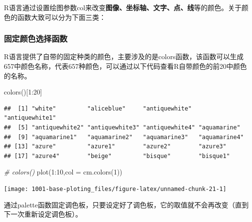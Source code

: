 \documentclass[
]{book}
\newenvironment{Shaded}{\begin{snugshade}}{\end{snugshade}}
\newcommand{\AttributeTok}[1]{\textcolor[rgb]{0.77,0.63,0.00}{#1}}
\newcommand{\CommentTok}[1]{\textcolor[rgb]{0.56,0.35,0.01}{\textit{#1}}}
\newcommand{\DecValTok}[1]{\textcolor[rgb]{0.00,0.00,0.81}{#1}}
\newcommand{\FunctionTok}[1]{\textcolor[rgb]{0.00,0.00,0.00}{#1}}
\newcommand{\NormalTok}[1]{#1}
\newcommand{\SpecialCharTok}[1]{\textcolor[rgb]{0.00,0.00,0.00}{#1}}
\begin{document}
R语言通过设置绘图参数col来改变\textbf{图像、坐标轴、文字、点、线}等的颜色。关于颜色的函数大致可以分为下面三类：

\hypertarget{ux56faux5b9aux989cux8272ux9009ux62e9ux51fdux6570}{%
\subsubsection{固定颜色选择函数}\label{ux56faux5b9aux989cux8272ux9009ux62e9ux51fdux6570}}

R语言提供了自带的固定种类的颜色，主要涉及的是colors函数，该函数可以生成657中颜色名称，代表657种颜色，可以通过以下代码查看R自带颜色的前20中颜色的名称。

\begin{Shaded}
\begin{Highlighting}[]
\FunctionTok{colors}\NormalTok{()[}\DecValTok{1}\SpecialCharTok{:}\DecValTok{20}\NormalTok{] }
\end{Highlighting}
\end{Shaded}

\begin{verbatim}
##  [1] "white"         "aliceblue"     "antiquewhite"  "antiquewhite1"
##  [5] "antiquewhite2" "antiquewhite3" "antiquewhite4" "aquamarine"   
##  [9] "aquamarine1"   "aquamarine2"   "aquamarine3"   "aquamarine4"  
## [13] "azure"         "azure1"        "azure2"        "azure3"       
## [17] "azure4"        "beige"         "bisque"        "bisque1"
\end{verbatim}

\begin{Shaded}
\begin{Highlighting}[]
\CommentTok{\# colors()}
\FunctionTok{plot}\NormalTok{(}\DecValTok{1}\SpecialCharTok{:}\DecValTok{10}\NormalTok{,}\AttributeTok{col =} \FunctionTok{cm.colors}\NormalTok{(}\DecValTok{1}\NormalTok{))}
\end{Highlighting}
\end{Shaded}

\begin{center}\texttt{[image: 1001-base-ploting\_files/figure-latex/unnamed-chunk-21-1]} \end{center}

通过palette函数固定调色板，只要设定好了调色板，它的取值就不会再改变（直到下一次重新设定调色板）。
\end{document}
